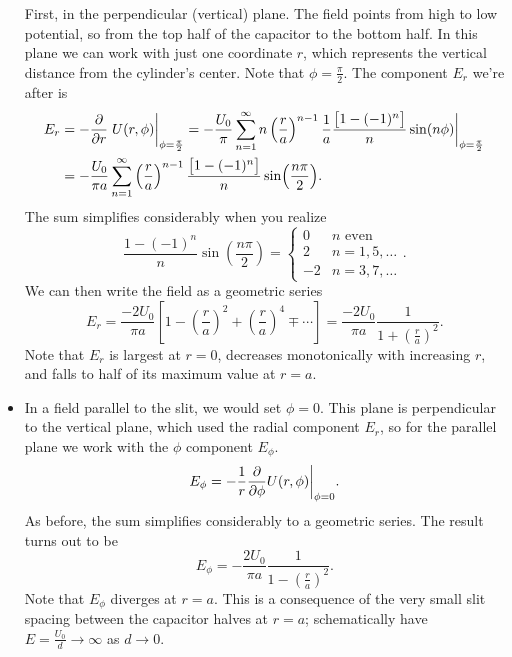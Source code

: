 \documentclass[11pt, a4paper]{article}
\begin{document}
\begin{itemize}
	First, in the perpendicular (vertical) plane. The field points from high to low potential, so from the top half of the capacitor to the bottom half. In this plane we can work with just one coordinate $ r $, which represents the vertical distance from the cylinder's center. Note that $ \phi = \frac{\pi}{2} $. The component $ E_{r} $ we're after is
	\begin{align*}
		E_{r} &= - \pdv{r}\eval{U(r, \phi)}_{\phi = \frac{\pi}{2}}  = - \frac{U_{0}}{\pi} \sum_{n = 1}^{\infty} n\left(\frac{r}{a}\right)^{n -1}\frac{1}{a}\frac{\big[1 - (-1)^{n}\big]}{n}\sin(n\phi)\bigg|_{\phi = \frac{\pi}{2}}\\
		&=  -\frac{U_{0}}{\pi a} \sum_{n= 1}^{\infty}\left(\frac{r}{a}\right)^{n-1} \frac{\big[1 - (-1)^{n}\big]}{n}\sin(\frac{n\pi}{2}).
	\end{align*}
	The sum simplifies considerably when you realize
	\begin{equation*}
		\frac{1 - (-1)^{n}}{n}\sin(\frac{n\pi}{2}) = 
		\begin{cases}
			0 & n \text{ even} \\
			2 & n = 1, 5,\ldots \\
			-2 & n = 3, 7,\ldots 
		\end{cases}.
	\end{equation*}
	We can then write the field as a geometric series
	\begin{equation*}
		E_{r} = \frac{-2U_{0}}{\pi a}\left[1 - \left(\frac{r}{a}\right)^{2} + \left(\frac{r}{a}\right)^{4} \mp \cdots  \right] = \frac{-2U_{0}}{\pi a} \frac{1}{1 + \left(\frac{r}{a}\right)^{2}}.
	\end{equation*}
	Note that $ E_{r} $ is largest at $ r = 0 $, decreases monotonically with increasing $ r $, and falls to half of its maximum value at $ r = a $. 
	
	\item In a field parallel to the slit, we would set $ \phi = 0 $. This plane is perpendicular to the vertical plane, which used the radial component $ E_{r} $, so for the parallel plane we work with the $ \phi $ component $ E_{\phi} $. 
	\begin{equation*}
		E_{\phi} = - \frac{1}{r}\pdv{\phi}U(r, \phi) \bigg |_{\phi = 0}.
	\end{equation*}
	As before, the sum simplifies considerably to a geometric series. The result turns out to be
	\begin{equation*}
		E_{\phi} = - \frac{2U_{0}}{\pi a}\frac{1}{1 - \left(\frac{r}{a}\right)^{2}}.
	\end{equation*}
	Note that $ E_{\phi} $ diverges at $ r = a $. This is a consequence of the very small slit spacing between the capacitor halves at $ r = a $; schematically have $ E = \frac{U_{0}}{d} \to \infty $ as $ d \to 0 $. 
	
\end{itemize}
\end{document}
